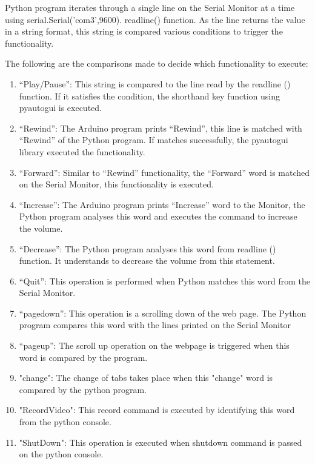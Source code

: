 \documentclass[12pt,journal]{IEEEtran}
\begin{document}
\par Python program iterates through a single line on the Serial Monitor at a time using serial.Serial('com3',9600). readline() function. As the line returns the value in a string format, this string is compared various conditions to trigger the functionality. 
\par
The following are the comparisons made to decide which functionality to execute:
\bigskip
\begin{enumerate}
  \item “Play/Pause”: This string is compared to the line read by the readline () function. If it satisfies the condition, the shorthand key function using pyautogui is executed.
  \bigskip
  \item “Rewind”: The Arduino program prints “Rewind”, this line is matched with “Rewind” of the Python program. If matches successfully, the pyautogui library executed the functionality.
  \bigskip
  \item “Forward”:  Similar to “Rewind” functionality, the “Forward” word is matched on the Serial Monitor, this functionality is executed.
  \bigskip
  \item “Increase”: The Arduino program prints “Increase” word to the Monitor, the Python program analyses this word and executes the command to increase the volume.
  \newpage
  \item  “Decrease”: The Python program analyses this word from readline () function. It understands to decrease the volume from this statement.
  \bigskip
  \item “Quit”: This operation is performed when Python matches this word from the Serial Monitor. 
  \bigskip
  \item “pagedown”:  This operation is a scrolling down of the web page. The Python program compares this word with the lines printed on the Serial Monitor
  \bigskip
  \item “pageup”: The scroll up operation on the webpage is triggered when this word is compared by the program.
  \bigskip
  \item "change": The change of tabs takes place when this "change" word is compared by the python program. 
  \bigskip
  \item "RecordVideo": This record command is executed by identifying this word from the python console.
  \bigskip
  \item "ShutDown": This operation is executed when shutdown command is passed on the python console.
\end{enumerate}
\end{document}
